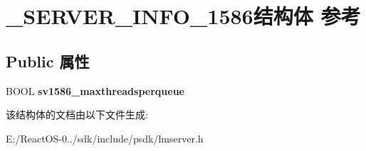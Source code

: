 \hypertarget{struct___s_e_r_v_e_r___i_n_f_o__1586}{}\section{\+\_\+\+S\+E\+R\+V\+E\+R\+\_\+\+I\+N\+F\+O\+\_\+1586结构体 参考}
\label{struct___s_e_r_v_e_r___i_n_f_o__1586}
\subsection*{Public 属性}
\begin{DoxyCompactItemize}
\item 
\mbox{\label{struct___s_e_r_v_e_r___i_n_f_o__1586_acc82ae8a376f0fd9259a04ade1aaaddd}} 
B\+O\+OL {\bfseries sv1586\+\_\+maxthreadsperqueue}
\end{DoxyCompactItemize}


该结构体的文档由以下文件生成\+:\begin{DoxyCompactItemize}
\item 
E\+:/\+React\+O\+S-\/0../sdk/include/psdk/lmserver.\+h\end{DoxyCompactItemize}
